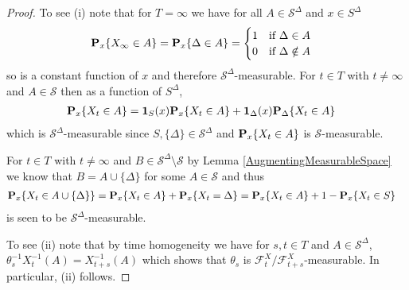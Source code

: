 \begin{proof}
To see (i) note that for $T = \infty$ we have for all $A \in \mathcal{S}^\Delta$ and $x \in S^\Delta$
\begin{align*}
\sprobability{X_\infty \in A}{x} &= \sprobability{\Delta \in A}{x} = \begin{cases}
1 & \text{if $\Delta \in A$} \\
0 & \text{if $\Delta \notin A$} 
\end{cases}
\end{align*}
so is a constant function of $x$ and therefore $\mathcal{S}^\Delta$-measurable.  For $t \in T$ with $t \neq \infty$ and $A \in \mathcal{S}$ then as a function of $S^\Delta$,
\begin{align*}
\sprobability{X_t \in A}{x} &= \characteristic{S}(x) \sprobability{X_t \in A}{x} + \characteristic{\Delta}(x) \sprobability{X_t \in A}{\Delta} 
\end{align*}
which is $\mathcal{S}^\Delta$-measurable since $S, \lbrace \Delta \rbrace \in \mathcal{S}^\Delta$ and $\sprobability{X_t \in A}{x}$ is $\mathcal{S}$-measurable.

For $t \in T$ with $t \neq \infty$ and $B \in \mathcal{S}^\Delta \setminus \mathcal{S}$ by Lemma \ref{AugmentingMeasurableSpace} we know that $B = A \cup \lbrace \Delta \rbrace$ for some $A \in \mathcal{S}$ and thus
\begin{align*}
\sprobability{X_t \in A \cup \lbrace \Delta \rbrace }{x} &=\sprobability{X_t \in A}{x} + \sprobability{X_t = \Delta }{x} = \sprobability{X_t \in A}{x} + 1 - \sprobability{X_t \in S}{x} 
\end{align*}
is seen to be $\mathcal{S}^\Delta$-measurable.

To see (ii) note that by time homogeneity we have for $s, t \in T$ and $A \in \mathcal{S}^\Delta$, $\theta_s^{-1} X_t^{-1}(A) = X_{t+s}^{-1}(A)$ which shows that $\theta_s$ is $\mathcal{F}^X_t/\mathcal{F}^X_{t+s}$-measurable.  In particular, (ii) follows.


\end{proof}
